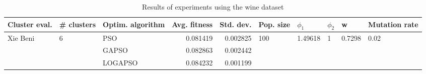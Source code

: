 \begin{table}
\centering
\caption{Results of experiments using the wine dataset}
\begin{tabular}{lllrrlllll}
\toprule
            Cluster eval. &        \# clusters & Optim. algorithm &  Avg. fitness &  Std. dev. &            Pop. size &               $\phi_{1}$ &         $\phi_{2}$ &                       w &         Mutation rate \\
\midrule
\multirow{3}{*}{Xie Beni} & \multirow{3}{*}{6} &              PSO &      0.081419 &   0.002825 & \multirow{3}{*}{100} & \multirow{3}{*}{1.49618} & \multirow{3}{*}{1} & \multirow{3}{*}{0.7298} & \multirow{3}{*}{0.02} \\
                          &                    &            GAPSO &      0.082863 &   0.002442 &                      &                          &                    &                         &                       \\
                          &                    &          LOGAPSO &      0.084232 &   0.001199 &                      &                          &                    &                         &                       \\
\bottomrule
\end{tabular}
\end{table}
